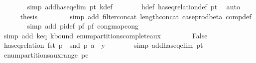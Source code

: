\begin{isabellebody}
\ \ \ \ \ \ \isamarkupfalse%
\ {\isacharparenleft}{\kern0pt}simp\ add{\isacharcolon}{\kern0pt}has{\isacharunderscore}{\kern0pt}eq{\isacharunderscore}{\kern0pt}elim\ p{}{\isacharunderscore}{\kern0pt}t\ k{\isacharunderscore}{\kern0pt}def{\isacharparenright}{\kern0pt}\isanewline
\ \ \ \ \ \ \isamarkupfalse%
\ h{\isacharunderscore}{\kern0pt}def\ has{\isacharunderscore}{\kern0pt}eq{\isacharunderscore}{\kern0pt}relation{\isacharunderscore}{\kern0pt}def\ p{}{\isacharunderscore}{\kern0pt}t\ \isamarkupfalse%
\ auto\isanewline
\ \ \ \ \isamarkupfalse%
\ {\isacharquery}{\kern0pt}thesis\ \isanewline
\ \ \ \ \ \ \isamarkupfalse%
\ {\isacharparenleft}{\kern0pt}simp\ add{\isacharcolon}{\kern0pt}\ filter{\isacharunderscore}{\kern0pt}concat\ length{\isacharunderscore}{\kern0pt}concat\ case{\isacharunderscore}{\kern0pt}prod{\isacharunderscore}{\kern0pt}beta{\isacharprime}{\kern0pt}\ comp{\isacharunderscore}{\kern0pt}def{\isacharparenright}{\kern0pt}\isanewline
\ \ \ \ \ \ \isamarkupfalse%
\ {\isacharparenleft}{\kern0pt}simp\ add{\isacharcolon}{\kern0pt}\ pi{\isacharunderscore}{\kern0pt}def\ p{}{\isacharunderscore}{\kern0pt}f\ p{}{\isacharunderscore}{\kern0pt}f\ cong{\isacharcolon}{\kern0pt}map{\isacharunderscore}{\kern0pt}cong{\isacharparenright}{\kern0pt}\isanewline
\ \ \ \ \ \ \isamarkupfalse%
\ {\isacharparenleft}{\kern0pt}simp\ add{\isacharcolon}{\kern0pt}\ k{\isacharunderscore}{\kern0pt}eq\ k{\isacharunderscore}{\kern0pt}bound\ enum{\isacharunderscore}{\kern0pt}partitions{\isacharunderscore}{\kern0pt}complete{\isacharunderscore}{\kern0pt}aux{\isacharparenright}{\kern0pt}\isanewline
\ \ \isamarkupfalse%
\isanewline
\ \ \ \ \isamarkupfalse%
\ False\isanewline
\ \ \ \ \isamarkupfalse%
\ {\isachardoublequoteopen}has{\isacharunderscore}{\kern0pt}eq{\isacharunderscore}{\kern0pt}relation\ {\isacharparenleft}{\kern0pt}fst\ p{}\ {\isacharhash}{\kern0pt}\ snd\ p{}{\isacharparenright}{\kern0pt}\ {\isacharparenleft}{\kern0pt}a\ {\isacharhash}{\kern0pt}\ y{\isacharparenright}{\kern0pt}{\isachardoublequoteclose}\isanewline
\ \ \ \ \ \ \isamarkupfalse%
\ {\isacharparenleft}{\kern0pt}simp\ add{\isacharcolon}{\kern0pt}has{\isacharunderscore}{\kern0pt}eq{\isacharunderscore}{\kern0pt}elim\ p{}{\isacharunderscore}{\kern0pt}t{\isacharparenright}{\kern0pt}\isanewline
\ \ \ \ \ \ \isamarkupfalse%
\ enum{\isacharunderscore}{\kern0pt}partitions{\isacharunderscore}{\kern0pt}aux{\isacharunderscore}{\kern0pt}range\ p{}{\isacharunderscore}{\kern0pt}e\isanewline

\end{isabellebody}

